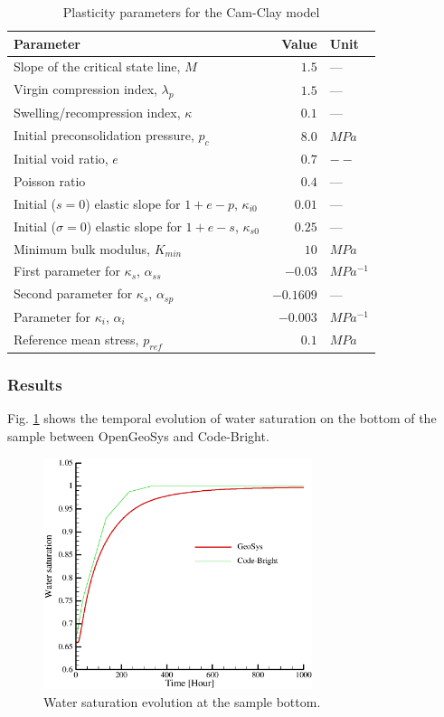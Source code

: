\begin{table}[!htb]
\centering
\begin{tabular}{lrl}
\hline\noalign{\smallskip}
Parameter & Value & Unit \\
\hline
Slope of the critical state line, $M$ & $1.5$ & ---\\
Virgin compression index, $\lambda_p$ & $1.5$ & ---\\
Swelling/recompression index, $\kappa$ & $0.1$ & ---\\
Initial preconsolidation pressure, $p_c$& $8.0$ & $MPa$\\
Initial void ratio, $e$ & $0.7$ & $--$\\
Poisson ratio & $0.4$ & ---\\
Initial ($s=0$) elastic slope for $1+e-p$, $\kappa_{i0}$& $0.01$ & ---\\
Initial ($\sigma=0$) elastic slope for $1+e-s$, $\kappa_{s0}$& $0.25$ & ---\\
Minimum bulk modulus, $K_{min}$ & $10$ &$MPa$\\
First parameter for $\kappa_s$, $\alpha_{ss}$ & $-0.03$ & $MPa^{-1}$\\
Second parameter for $\kappa_s$, $\alpha_{sp}$ & $-0.1609$ & ---\\
Parameter for $\kappa_i$, $\alpha_{i}$ & $-0.003$ & $MPa^{-1}$\\
Reference mean stress, $p_{ref}$ & $0.1$ & $MPa$\\
\hline
\end{tabular}
\caption{Plasticity parameters for the Cam-Clay model} %
\label{tab:pls}
\end{table}

\subsubsection*{Results}
Fig. \ref{fig:S_top} shows the temporal evolution of water saturation on the bottom of the sample between OpenGeoSys and Code-Bright.

\begin{figure}[!thb]
\begin{center}
\includegraphics[width=0.7\textwidth]{chapter_14/figures/fig_14_3_25}
\end{center}
\caption{Water saturation evolution at the sample bottom.}
\label{fig:S_top}
\end{figure}